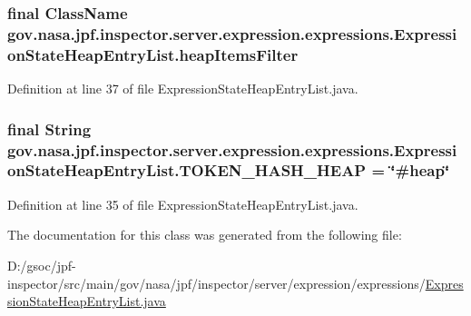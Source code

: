 \subsubsection[{\texorpdfstring{heap\+Items\+Filter}{heapItemsFilter}}]{\setlength{\rightskip}{0pt plus 5cm}final {\bf Class\+Name} gov.\+nasa.\+jpf.\+inspector.\+server.\+expression.\+expressions.\+Expression\+State\+Heap\+Entry\+List.\+heap\+Items\+Filter\hspace{0.3cm}{\ttfamily [private]}}\hypertarget{classgov_1_1nasa_1_1jpf_1_1inspector_1_1server_1_1expression_1_1expressions_1_1_expression_state_heap_entry_list_a6c9bd3b9580253d35d991a00a8a5c2e8}{}\label{classgov_1_1nasa_1_1jpf_1_1inspector_1_1server_1_1expression_1_1expressions_1_1_expression_state_heap_entry_list_a6c9bd3b9580253d35d991a00a8a5c2e8}


Definition at line 37 of file Expression\+State\+Heap\+Entry\+List.\+java.

\subsubsection[{\texorpdfstring{T\+O\+K\+E\+N\+\_\+\+H\+A\+S\+H\+\_\+\+H\+E\+AP}{TOKEN_HASH_HEAP}}]{\setlength{\rightskip}{0pt plus 5cm}final String gov.\+nasa.\+jpf.\+inspector.\+server.\+expression.\+expressions.\+Expression\+State\+Heap\+Entry\+List.\+T\+O\+K\+E\+N\+\_\+\+H\+A\+S\+H\+\_\+\+H\+E\+AP = \char`\"{}\#heap\char`\"{}\hspace{0.3cm}{\ttfamily [static]}}\hypertarget{classgov_1_1nasa_1_1jpf_1_1inspector_1_1server_1_1expression_1_1expressions_1_1_expression_state_heap_entry_list_af7ffb3ee68ccbfc30c198ff37a6d3a6f}{}\label{classgov_1_1nasa_1_1jpf_1_1inspector_1_1server_1_1expression_1_1expressions_1_1_expression_state_heap_entry_list_af7ffb3ee68ccbfc30c198ff37a6d3a6f}


Definition at line 35 of file Expression\+State\+Heap\+Entry\+List.\+java.



The documentation for this class was generated from the following file\+:\begin{DoxyCompactItemize}
\item 
D\+:/gsoc/jpf-\/inspector/src/main/gov/nasa/jpf/inspector/server/expression/expressions/\hyperlink{_expression_state_heap_entry_list_8java}{Expression\+State\+Heap\+Entry\+List.\+java}\end{DoxyCompactItemize}
